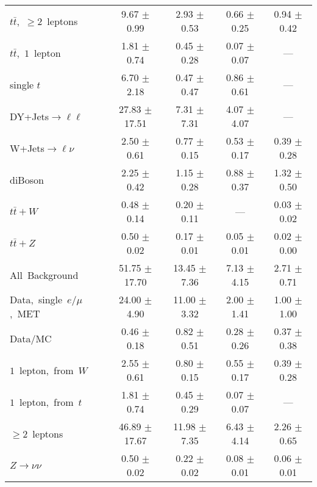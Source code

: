 \documentclass{article}
\begin{document}
\begin{longtable}{|l|c|c|c|c|}
$t\bar{t}$,~$\ge2$~leptons & 9.67 $\pm$ 0.99  & 2.93 $\pm$ 0.53  & 0.66 $\pm$ 0.25  & 0.94 $\pm$ 0.42 \\* 
$t\bar{t}$,~$1$~lepton & 1.81 $\pm$ 0.74  & 0.45 $\pm$ 0.28  & 0.07 $\pm$ 0.07  & --- \\* 
single $t$  & 6.70 $\pm$ 2.18  & 0.47 $\pm$ 0.47  & 0.86 $\pm$ 0.61  & --- \\* 
DY+Jets$\rightarrow\ell\ell$  & 27.83 $\pm$ 17.51  & 7.31 $\pm$ 7.31  & 4.07 $\pm$ 4.07  & --- \\* 
W+Jets$\rightarrow\ell\nu$  & 2.50 $\pm$ 0.61  & 0.77 $\pm$ 0.15  & 0.53 $\pm$ 0.17  & 0.39 $\pm$ 0.28 \\* 
diBoson  & 2.25 $\pm$ 0.42  & 1.15 $\pm$ 0.28  & 0.88 $\pm$ 0.37  & 1.32 $\pm$ 0.50 \\* 
$t\bar{t}+W$  & 0.48 $\pm$ 0.14  & 0.20 $\pm$ 0.11  & ---  & 0.03 $\pm$ 0.02 \\* 
$t\bar{t}+Z$  & 0.50 $\pm$ 0.02  & 0.17 $\pm$ 0.01  & 0.05 $\pm$ 0.01  & 0.02 $\pm$ 0.00 \\* 
\hline \hline 
All~Background  & 51.75 $\pm$ 17.70  & 13.45 $\pm$ 7.36  & 7.13 $\pm$ 4.15  & 2.71 $\pm$ 0.71 \\* 
Data,~single~$e/\mu$,~MET  & 24.00 $\pm$ 4.90  & 11.00 $\pm$ 3.32  & 2.00 $\pm$ 1.41  & 1.00 $\pm$ 1.00 \\* 
Data/MC  & 0.46 $\pm$ 0.18  & 0.82 $\pm$ 0.51  & 0.28 $\pm$ 0.26  & 0.37 $\pm$ 0.38 \\* 
\hline \hline 
$1$~lepton,~from~$W$  & 2.55 $\pm$ 0.61  & 0.80 $\pm$ 0.15  & 0.55 $\pm$ 0.17  & 0.39 $\pm$ 0.28 \\* 
$1$~lepton,~from~$t$  & 1.81 $\pm$ 0.74  & 0.45 $\pm$ 0.29  & 0.07 $\pm$ 0.07  & --- \\* 
$\ge2$~leptons  & 46.89 $\pm$ 17.67  & 11.98 $\pm$ 7.35  & 6.43 $\pm$ 4.14  & 2.26 $\pm$ 0.65 \\* 
$Z\rightarrow\nu\nu$  & 0.50 $\pm$ 0.02  & 0.22 $\pm$ 0.02  & 0.08 $\pm$ 0.01  & 0.06 $\pm$ 0.01 \\* 
\hline 
\end{longtable} 

 
 
 
 
\pagebreak 

 
 
 
 
\end{document}
